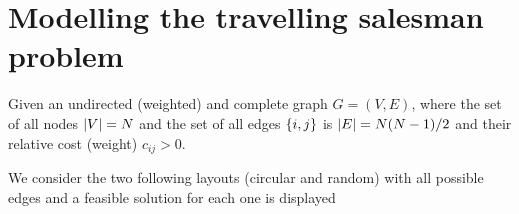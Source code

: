 \section{Modelling the travelling salesman problem}\label{sc:tsp}

Given an undirected (weighted) and complete graph $G=(V,E)$, where the set of all nodes $\lvert V\rvert=N$ and the set of all edges $\{i,j\}$ is $\lvert E\rvert=N(N-1)/2$ and their relative cost (weight) $c_{ij}>0$.%

We consider the two following layouts (circular and random) with all possible edges and a feasible solution for each one is displayed

